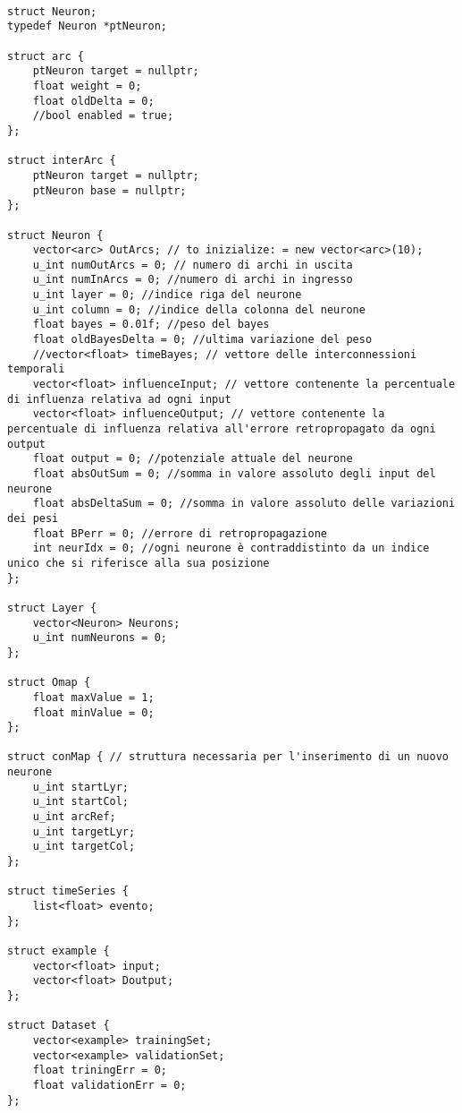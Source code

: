 \documentclass[10pt,a4paper]{article}
\begin{document}
\begin{lstlisting}[style=mycuda, caption=struct strutturali del modello, captionpos=b]

struct Neuron;
typedef Neuron *ptNeuron;

struct arc {
	ptNeuron target = nullptr;
	float weight = 0;
	float oldDelta = 0;
	//bool enabled = true;
};

struct interArc {
	ptNeuron target = nullptr;
	ptNeuron base = nullptr;
};

struct Neuron {
	vector<arc> OutArcs; // to inizialize: = new vector<arc>(10);
	u_int numOutArcs = 0; // numero di archi in uscita
	u_int numInArcs = 0; //numero di archi in ingresso
	u_int layer = 0; //indice riga del neurone
	u_int column = 0; //indice della colonna del neurone
	float bayes = 0.01f; //peso del bayes
	float oldBayesDelta = 0; //ultima variazione del peso
	//vector<float> timeBayes; // vettore delle interconnessioni temporali
	vector<float> influenceInput; // vettore contenente la percentuale di influenza relativa ad ogni input
	vector<float> influenceOutput; // vettore contenente la percentuale di influenza relativa all'errore retropropagato da ogni output
	float output = 0; //potenziale attuale del neurone
	float absOutSum = 0; //somma in valore assoluto degli input del neurone
	float absDeltaSum = 0; //somma in valore assoluto delle variazioni dei pesi
	float BPerr = 0; //errore di retropropagazione
	int neurIdx = 0; //ogni neurone è contraddistinto da un indice unico che si riferisce alla sua posizione
};

struct Layer {
	vector<Neuron> Neurons;
	u_int numNeurons = 0;
};

struct Omap {
	float maxValue = 1;
	float minValue = 0;
};

struct conMap { // struttura necessaria per l'inserimento di un nuovo neurone
	u_int startLyr;
	u_int startCol;
	u_int arcRef;
	u_int targetLyr;
	u_int targetCol;
};

struct timeSeries {
	list<float> evento;
};

struct example {
	vector<float> input;
	vector<float> Doutput;
};

struct Dataset {
	vector<example> trainingSet;
	vector<example> validationSet;
	float triningErr = 0;
	float validationErr = 0;
};

\end{lstlisting}
\end{document}
